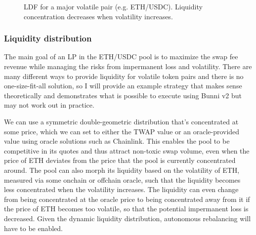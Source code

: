 \documentclass[twocolumn]{article}
\begin{document}
\begin{figure}
  \centering
  \caption{LDF for a major volatile pair (e.g. ETH/USDC). Liquidity concentration decreases when volatility increases.}
  \label{fig:major_volatile}
\end{figure}

\subsubsection{Liquidity distribution}

The main goal of an LP in the ETH/USDC pool is to maximize the swap fee revenue while managing the risks from impermanent loss and volatility. There are many different ways to provide liquidity for volatile token pairs and there is no one-size-fit-all solution, so I will provide an example strategy that makes sense theoretically and demonstrates what is possible to execute using Bunni v2 but may not work out in practice.

We can use a symmetric double-geometric distribution that's concentrated at some price, which we can set to either the TWAP value or an oracle-provided value using oracle solutions such as Chainlink. This enables the pool to be competitive in its quotes and thus attract non-toxic swap volume, even when the price of ETH deviates from the price that the pool is currently concentrated around. The pool can also morph its liquidity based on the volatility of ETH, measured via some onchain or offchain oracle, such that the liquidity becomes less concentrated when the volatility increases. The liquidity can even change from being concentrated at the oracle price to being concentrated away from it if the price of ETH becomes too volatile, so that the potential impermanent loss is decreased. Given the dynamic liquidity distribution, autonomous rebalancing will have to be enabled.
\end{document}
